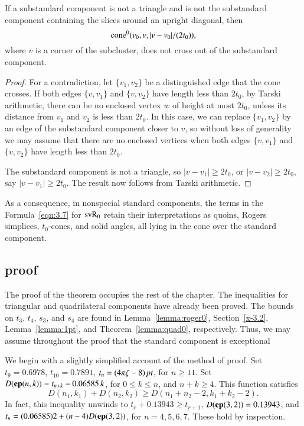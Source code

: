 \begin{lemma}
    \label{lemma:no-cross}
If a substandard component is not a triangle and is not  the substandard component
containing the slices around an upright diagonal, then
   $${\operatorname{cone}}^0(v_0,v,|v-v_0|/(2t_0)),$$
where $v$ is a corner of the subcluster,
does not cross out of the substandard component.

\end{lemma}

\begin{proof}
For a contradiction, let $\{v_1,v_2\}$ be a distinguished edge that
the cone crosses. If both edges $\{v,v_1\}$ and $\{v,v_2\}$ have
length less than $2t_0$, by Tarski arithmetic,
there can be no enclosed vertex $w$ of
height at most $2t_0$, unless its distance from $v_1$ and $v_2$ is
less than $2t_0$.
In this case, we can replace $\{v_1,v_2\}$ by an edge of the
substandard component closer to $v$, so without loss of generality we may
assume that there are no enclosed vertices when both edges
$\{v,v_1\}$ and $\{v,v_2\}$ have length less than $2t_0$.

The substandard component is not a triangle, so $|v-v_1|\ge 2t_0$, or
$|v-v_2|\ge 2t_0$, say $|v-v_1|\ge 2t_0$.  The result now follows
from Tarski arithmetic.
\end{proof}

As a consequence, in nonspecial standard components, the terms in the
Formula~\ref{eqn:3.7} for ${\operatorname{svR}}_0$ retain their interpretations as
quoins, Rogers simplices, $t_0$-cones, and solid angles, all lying
in the cone over the standard component.


\subsection{proof} %

The proof of the theorem occupies the rest of the chapter. The
inequalities for triangular and quadrilateral components have already
been proved. The bounds on $t_3$, $t_4$, $s_3$, and $s_4$ are
found in Lemma~\ref{lemma:roger0}, Section~\ref{x-3.2},
Lemma~\ref{lemma:1pt}, and Theorem~\ref{lemma:quad0},
respectively. Thus, we may assume throughout the proof that the
standard component is exceptional

We begin with a slightly simplified account of the method of
proof. Set $t_9=0.6978$, $t_{10}= 0.7891$, $t_n=(4\pi\zeta-8)\,\hbox{\it pt}$, for
$n\ge 11$. Set $D({\operatorname{\bf ep}}{(n,k)}) = t_{n+k} - 0.06585\,k$, for $0\le k\le n$,
and $n+k\ge 4$. This function satisfies
    \begin{equation}
    D(n_1,k_1)+D(n_2,k_2)\ge D(n_1+n_2-2,k_1+k_2-2).
    \label{eqn:D-superadd}
    \end{equation}
In fact, this inequality unwinds to $t_r+0.13943\ge t_{r+1}$,
$D({\operatorname{\bf ep}}{(3,2)})=0.13943$, and $t_n =(0.06585)2+(n-4)D({\operatorname{\bf ep}}{(3,2)})$, for $n=4,5,6,7$.
These hold  by inspection.

